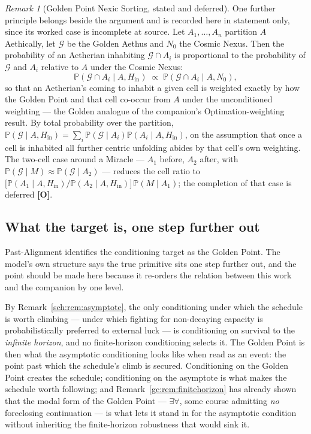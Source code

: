 \documentclass[11pt]{article}
\numberwithin{equation}{section}
\theoremstyle{plain}
\theoremstyle{definition}
\theoremstyle{remark}
\newtheorem{remark}[theorem]{Remark}
\newcommand{\PP}{\mathbb{P}}
\begin{document}
\begin{remark}[Golden Point Nexic Sorting, stated and deferred]
\label{ra:rem:sorting}
One further principle belongs beside the argument and is recorded here in
statement only, since its worked case is incomplete at source. Let
$A_1,\dots,A_n$ partition $A$ Aethically, let $\mathcal G$ be the Golden
Aethus and $N_0$ the Cosmic Nexus. Then the probability of an Aetherian
inhabiting $\mathcal G\cap A_i$ is proportional to the probability of
$\mathcal G$ and $A_i$ relative to $A$ under the Cosmic Nexus:
\begin{equation}\label{ra:eq:sorting}
\PP(\mathcal G\cap A_i\mid A,H_{\mathrm{in}})\;\propto\;
\PP(\mathcal G\cap A_i\mid A,N_0),
\end{equation}
so that an Aetherian's coming to inhabit a given cell is weighted
exactly by how the Golden Point and that cell co-occur from $A$ under
the unconditioned weighting --- the Golden analogue of the companion's
Optimation-weighting result. By total probability over the partition,
$\PP(\mathcal G\mid A,H_{\mathrm{in}})=\sum_i\PP(\mathcal G\mid A_i)
\PP(A_i\mid A,H_{\mathrm{in}})$, on the assumption that once a cell is
inhabited all further centric unfolding abides by that cell's own
weighting. The two-cell case around a Miracle --- $A_1$ before, $A_2$
after, with $\PP(\mathcal G\mid M)\approx\PP(\mathcal G\mid A_2)$ ---
reduces the cell ratio to
$\bigl[\PP(A_1\mid A,H_{\mathrm{in}})/\PP(A_2\mid A,H_{\mathrm{in}})\bigr]
\,\PP(M\mid A_1)$; the completion of that case is deferred
\textbf{[O]}.
\end{remark}

\subsection{What the target is, one step further out}\label{ra:sub:asymptote}

Past-Alignment identifies the conditioning target as the Golden Point.
The model's own structure says the true primitive sits one step further
out, and the point should be made here because it re-orders the relation
between this work and the companion by one level.

By Remark~\ref{sch:rem:asymptote}, the only conditioning under which the
schedule is worth climbing --- under which fighting for non-decaying
capacity is probabilistically preferred to external luck --- is
conditioning on survival to the \emph{infinite horizon}, and no
finite-horizon conditioning selects it. The Golden Point is then what
the asymptotic conditioning looks like when read as an event: the point
past which the schedule's climb is secured. Conditioning on the Golden
Point creates the schedule; conditioning on the asymptote is what makes
the schedule worth following; and Remark~\ref{gc:rem:finitehorizon} has
already shown that the modal form of the Golden Point --- $\exists\forall$,
some course admitting \emph{no} foreclosing continuation --- is what lets
it stand in for the asymptotic condition without inheriting the
finite-horizon robustness that would sink it.
\end{document}
